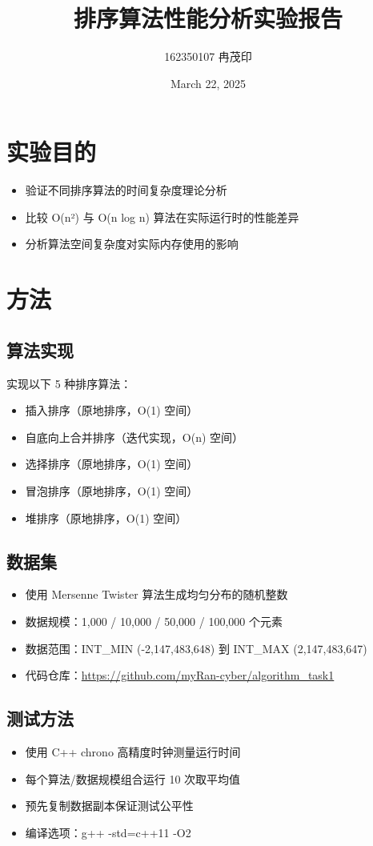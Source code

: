 \documentclass[UTF8]{article}
\title{排序算法性能分析实验报告}
\author{162350107 冉茂印}
\date{March 22, 2025 }
\begin{document}
\maketitle

\section{实验目的}
\begin{itemize}
    \item 验证不同排序算法的时间复杂度理论分析
    \item 比较 O(n²) 与 O(n log n) 算法在实际运行时的性能差异
    \item 分析算法空间复杂度对实际内存使用的影响
\end{itemize}

\section{方法}
\subsection{算法实现}
实现以下 5 种排序算法：
\begin{itemize}
    \item 插入排序（原地排序，O(1) 空间）
    \item 自底向上合并排序（迭代实现，O(n) 空间）
    \item 选择排序（原地排序，O(1) 空间）
    \item 冒泡排序（原地排序，O(1) 空间）
    \item 堆排序（原地排序，O(1) 空间）
\end{itemize}

\subsection{数据集}


\begin{itemize}
    \item 使用 Mersenne Twister 算法生成均匀分布的随机整数
    \item 数据规模：1,000 / 10,000 / 50,000 / 100,000 个元素
    \item 数据范围：INT\_MIN (-2,147,483,648) 到 INT\_MAX (2,147,483,647)
    \item 代码仓库：\url{https://github.com/myRan-cyber/algorithm\_task1}
\end{itemize}

\subsection{测试方法}
\begin{itemize}
    \item 使用 C++ chrono 高精度时钟测量运行时间
    \item 每个算法/数据规模组合运行 10 次取平均值
    \item 预先复制数据副本保证测试公平性
    \item 编译选项：g++ -std=c++11 -O2
\end{itemize}
\end{document}
